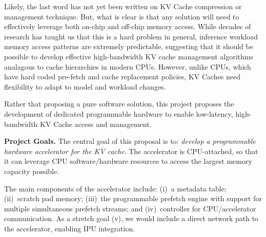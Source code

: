\documentclass[11pt]{article}
\def\PAR#1{\par\medskip\noindent\textbf{#1}}
\begin{document}
Likely, the last word has not yet been written on KV Cache compression
or management technique. But, what is clear is that any solution will
need to effectively leverage both on-chip and off-chip memory access.
While decades of research has taught us that this is a hard problem in
general, inference workload memory access patterns are extremely
predictable, suggesting that it should be possible to develop
effective high-bandwidth KV cache management algorithms analagous to
cache hierarchies in modern CPUs. However, unlike CPUs, which have
hard coded pre-fetch and cache replacement policies, KV Caches need
flexibility to adapt to model and workload changes.

Rather that proposing a pure software solution, this project proposes
the development of dedicated programmable hardware to enable
low-latency, high-bandwidth KV Cache access and management.

  


\PAR{Project Goals.}
%
The central goal of this proposal is to: \emph{develop a programmable
hardware accelerator for the KV cache}. The accelerator is
CPU-attached, so that it can leverage CPU software/hardware resources
to access the largest memory capacity possible.

The main components of the accelerator include: (i)~a metadata table;
(ii)~scratch pad memory; (iii)~the programmable prefetch engine with
support for multiple simultaneous prefetch streams; and
(iv)~controller for CPU/accelerator communication. As a stretch goal
(v), we would include a direct network path to the accelerator,
enabling IPU integration.
\end{document}
